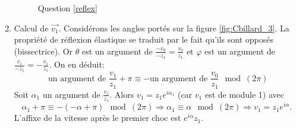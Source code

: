 \begin{enumerate}
\begin{figure}[h]
  \centering
   \hspace{1cm}
  \caption{Question \ref{reflex}}
\end{figure}

\item Calcul de $\overrightarrow{v_1}$. \label{reflex} Considérons les angles portés sur la figure \ref{fig:Cbillard_3}. La propriété de réflexion élastique se traduit par le fait qu'ils sont opposés (bissectrice).\newline
Or $\theta$ est un argument de $\frac{-v_0}{-z_1}= \frac{v_0}{z_1}$ et $\varphi$ est un argument de $\frac{v_1}{-z_1}=-\frac{v_1}{z_1}$. On en déduit:
\begin{displaymath}
\text{ un argument de } \frac{v_1}{z_1} + \pi \equiv - \text{un argument de }\frac{v_0}{z_1} \mod (2\pi)   
\end{displaymath}
Soit $\alpha_1$ un argument de $\frac{v_1}{z_1}$. Alors $v_1 = z_1e^{i\alpha_1}$ (car $v_1$ est de module 1) avec
\[
\alpha_1 + \pi \equiv -(-\alpha + \pi) \mod (2\pi)
\Rightarrow \alpha_1 \equiv \alpha \mod (2\pi)
\Rightarrow v_1 = z_1e^{i\alpha}.
\]
L'affixe de la vitesse après le premier choc est $e^{i\alpha}z_1$.


\end{enumerate}
